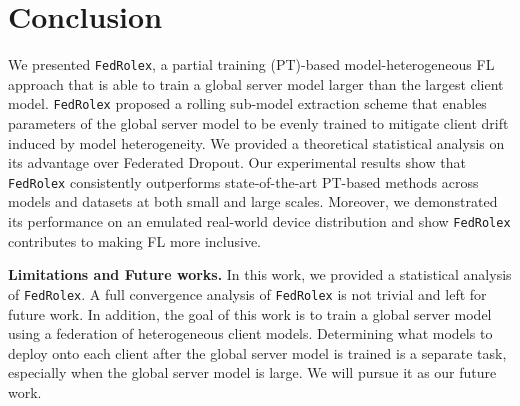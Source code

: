 \documentclass{article}
\begin{document}
\vspace{-2mm}

\section{Conclusion}
\label{sec.conclusion}
\vspace{-2mm}
We presented \texttt{FedRolex}, a partial training (PT)-based model-heterogeneous FL approach that is able to train a global server model larger than the largest client model.
%
\texttt{FedRolex} proposed a rolling sub-model extraction scheme that enables parameters of the global server model to be evenly trained to mitigate client drift induced by model heterogeneity. We provided a theoretical statistical analysis on its advantage over Federated Dropout.
%
Our experimental results show that \texttt{FedRolex} consistently outperforms state-of-the-art PT-based methods across models and datasets at both small and large scales. Moreover, we demonstrated its performance on an emulated real-world device distribution and show \texttt{FedRolex} contributes to making FL more inclusive. %

\textbf{Limitations and Future works.}
In this work, we provided a statistical analysis of \texttt{FedRolex}. A full convergence analysis of \texttt{FedRolex} is not trivial and left for future work. 
%
In addition, the goal of this work is to train a  global server model using a federation of heterogeneous client models. Determining what models to deploy onto each client after the global server model is trained is a separate task, especially when the global server model is large. %
We will pursue it as our future work. 
 




\end{document}
